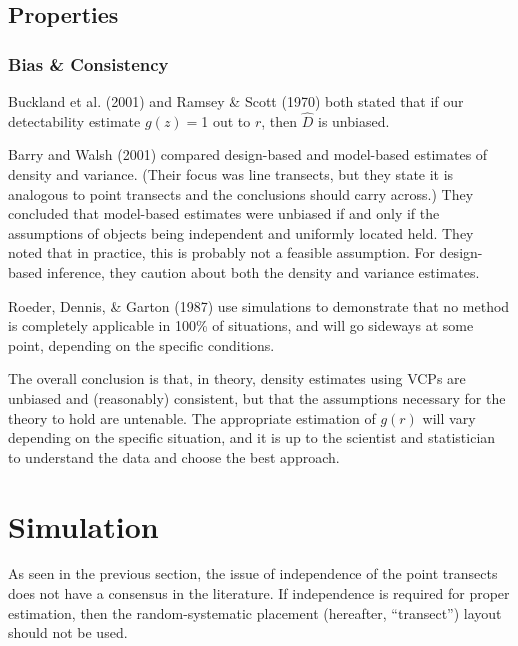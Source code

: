 \documentclass[12pt]{article}
\begin{document}



\subsection{Properties}
\subsubsection{Bias \& Consistency}
\textcite{buckland2001,ramsey1979} Buckland et al. (2001) and Ramsey \& Scott (1970) both stated that if our detectability estimate $g(z)=$1 out to $r$, then $\hat{D}$ is unbiased. 

\textcite{barry2001} Barry and Walsh (2001) compared design-based and  model-based estimates of density and variance. (Their focus was line transects, but they state it is analogous to point transects and the conclusions should carry across.) They concluded that model-based estimates were unbiased if and only if the assumptions of objects being independent and uniformly located held. They noted that in practice, this is probably not a feasible assumption. For design-based inference, they caution about both the density and variance estimates.

\textcite{roeder1987} Roeder, Dennis, \& Garton (1987) use simulations to demonstrate that no method is completely applicable in 100\% of situations, and will go sideways at some point, depending on the specific conditions.

The overall conclusion is that, in theory, density estimates using VCPs are unbiased and (reasonably) consistent, but that the assumptions necessary for the theory to hold are untenable. The appropriate estimation of $g(r)$ will vary depending on the specific situation, and it is up to the scientist and statistician to understand the data and choose the best approach.



\section{Simulation}
As seen in the previous section, the issue of independence of the point transects does not have a consensus in the literature. If independence is required for proper estimation, then the random-systematic placement (hereafter, ``transect'') layout should not be used. 
\end{document}
